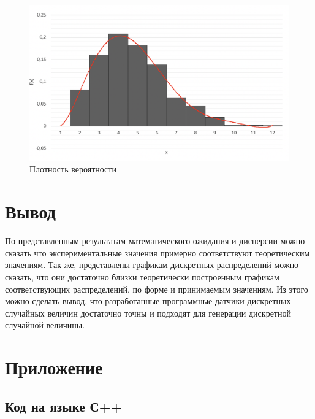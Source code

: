 \documentclass{article}
\begin{document}
		\begin{figure}[!htb]
			\includegraphics[scale = 0.38]{poisson/1.png}
			\caption{Плотность вероятности}
   		\end{figure}
   	\newpage
   	
	   \section{Вывод}
		По представленным результатам математического ожидания и дисперсии можно сказать что экспериментальные значения примерно соответствуют теоретическим значениям.
		Так же, представлены графикам дискретных распределений можно сказать, что они достаточно близки теоретически построенным графикам соответствующих распределений, по форме и принимаемым значениям.
		Из этого можно сделать вывод, что разработанные программные датчики  дискретных случайных величин достаточно точны и подходят для генерации дискретной случайной величины.
	\newpage
	
   	\section{Приложение}
   		\subsection{Код на языке С++}
   			
			
			
	
	
\end{document}
